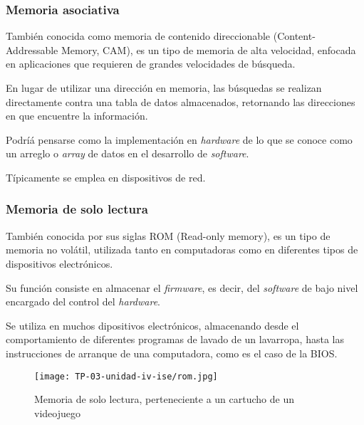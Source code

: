 \documentclass[12pt]{article}
\begin{document}
\subsubsection{Memoria asociativa}

También conocida como memoria de contenido direccionable
(Content-Addressable Memory, CAM),
es un tipo de memoria de alta velocidad,
enfocada en aplicaciones que requieren de grandes velocidades de búsqueda.

En lugar de utilizar una dirección en memoria, las búsquedas 
se realizan directamente contra una tabla de datos almacenados,
retornando las direcciones en que encuentre la información.

Podríá pensarse como la implementación en \textit{hardware} 
de lo que se conoce como un arreglo o \textit{array} de datos en el 
desarrollo de \textit{software}.

Típicamente se emplea en dispositivos de red.

\subsubsection{Memoria de solo lectura}

También conocida por sus siglas ROM 
(Read-only memory),
es un tipo de memoria no volátil,
utilizada tanto en computadoras como en diferentes tipos de dispositivos 
electrónicos.

Su función consiste en almacenar el \textit{firmware},
es decir, del \textit{software} de bajo nivel encargado del control del 
\textit{hardware}.

Se utiliza en muchos dipositivos electrónicos,
almacenando desde el comportamiento de diferentes programas de lavado de un 
lavarropa, hasta las instrucciones de arranque de una computadora,
como es el caso de la BIOS.

\begin{figure}[h]
  \centering
  \texttt{[image: TP-03-unidad-iv-ise/rom.jpg]}
  \caption{Memoria de solo lectura, perteneciente a un cartucho de un videojuego}
\end{figure}
\end{document}
